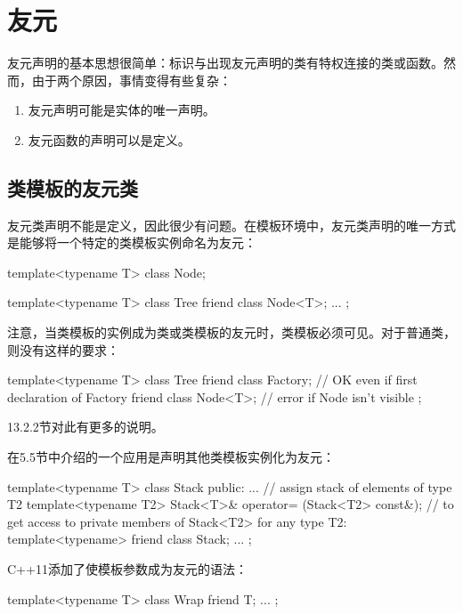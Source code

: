 \section{友元}

友元声明的基本思想很简单：标识与出现友元声明的类有特权连接的类或函数。然而，由于两个原因，事情变得有些复杂：

\begin{enumerate}
\item 
友元声明可能是实体的唯一声明。

\item 
友元函数的声明可以是定义。
\end{enumerate}

\subsection{类模板的友元类}

友元类声明不能是定义，因此很少有问题。在模板环境中，友元类声明的唯一方式是能够将一个特定的类模板实例命名为友元：

\begin{cpp}
template<typename T>
class Node;

template<typename T>
class Tree {
	friend class Node<T>;
	...
};
\end{cpp}

注意，当类模板的实例成为类或类模板的友元时，类模板必须可见。对于普通类，则没有这样的要求：

\begin{cpp}
template<typename T>
class Tree {
	friend class Factory; // OK even if first declaration of Factory
	friend class Node<T>; // error if Node isn't visible
};
\end{cpp}

13.2.2节对此有更多的说明。

在5.5节中介绍的一个应用是声明其他类模板实例化为友元：

\begin{cpp}
template<typename T>
class Stack {
	public:
	...
	// assign stack of elements of type T2
	template<typename T2>
	Stack<T>& operator= (Stack<T2> const&);
	// to get access to private members of Stack<T2> for any type T2:
	template<typename> friend class Stack;
	...
};
\end{cpp}

C++11添加了使模板参数成为友元的语法：

\begin{cpp}
template<typename T>
class Wrap {
	friend T;
	...
};
\end{cpp}

